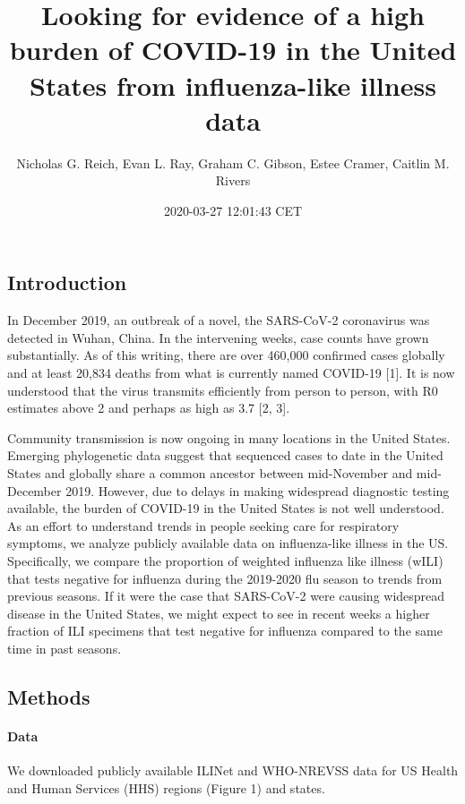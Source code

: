 \documentclass[]{article}
\title{Looking for evidence of a high burden of COVID-19 in the United States
from influenza-like illness data}
\author{Nicholas G. Reich, Evan L. Ray, Graham C. Gibson, Estee Cramer, Caitlin
M. Rivers}
\date{2020-03-27 12:01:43 CET}
\let\oldparagraph\paragraph
\renewcommand{\paragraph}[1]{\oldparagraph{#1}\mbox{}}
\begin{document}
\maketitle

\hypertarget{introduction}{%
\subsection{Introduction}\label{introduction}}

In December 2019, an outbreak of a novel, the SARS-CoV-2 coronavirus was
detected in Wuhan, China. In the intervening weeks, case counts have
grown substantially. As of this writing, there are over 460,000
confirmed cases globally and at least 20,834 deaths from what is
currently named COVID-19 {[}1{]}. It is now understood that the virus
transmits efficiently from person to person, with R0 estimates above 2
and perhaps as high as 3.7 {[}2, 3{]}.

Community transmission is now ongoing in many locations in the United
States. Emerging phylogenetic data suggest that sequenced cases to date
in the United States and globally share a common ancestor between
mid-November and mid-December 2019. However, due to delays in making
widespread diagnostic testing available, the burden of COVID-19 in the
United States is not well understood. As an effort to understand trends
in people seeking care for respiratory symptoms, we analyze publicly
available data on influenza-like illness in the US. Specifically, we
compare the proportion of weighted influenza like illness (wILI) that
tests negative for influenza during the 2019-2020 flu season to trends
from previous seasons. If it were the case that SARS-CoV-2 were causing
widespread disease in the United States, we might expect to see in
recent weeks a higher fraction of ILI specimens that test negative for
influenza compared to the same time in past seasons.

\hypertarget{methods}{%
\subsection{Methods}\label{methods}}

\hypertarget{data}{%
\paragraph{Data}\label{data}}

We downloaded publicly available ILINet and WHO-NREVSS data for US
Health and Human Services (HHS) regions (Figure 1) and states.
\end{document}
